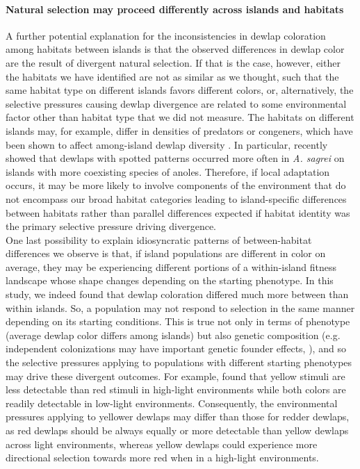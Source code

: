\paragraph{Natural selection may proceed differently across islands and habitats} A further potential explanation for the inconsistencies in dewlap coloration among habitats between islands is that the observed differences in dewlap color are the result of divergent natural selection. If that is the case, however, either the habitats we have identified are not as similar as we thought, such that the same habitat type on different islands favors different colors, or, alternatively, the selective pressures causing dewlap divergence are related to some environmental factor other than habitat type that we did not measure. The habitats on different islands may, for example, differ in densities of predators or congeners, which have been shown to affect among-island dewlap diversity \cite{Vanhooydonck2009, Baeckens2018}. In particular, \citet{Baeckens2018} recently showed that dewlaps with spotted patterns occurred more often in \textit{A. sagrei} on islands with more coexisting species of anoles. Therefore, if local adaptation occurs, it may be more likely to involve components of the environment that do not encompass our broad habitat categories leading to island-specific differences between habitats rather than parallel differences expected if habitat identity was the primary selective pressure driving divergence.\\ 

One last possibility to explain idiosyncratic patterns of between-habitat differences we observe is that, if island populations are different in color on average, they may be experiencing different portions of a within-island fitness landscape whose shape changes depending on the starting phenotype. In this study, we indeed found that dewlap coloration differed much more between than within islands. So, a population may not respond to selection in the same manner depending on its starting conditions. This is true not only in terms of phenotype (average dewlap color differs among islands) but also genetic composition (e.g. independent colonizations may have important genetic founder effects, \citealt{Reynolds2020}), and so the selective pressures applying to populations with different starting phenotypes may drive these divergent outcomes. For example, \citet{Fleishman2020} found that yellow stimuli are less detectable than red stimuli in high-light environments while both colors are readily detectable in low-light environments. Consequently, the environmental pressures applying to yellower dewlaps may differ than those for redder dewlaps, as red dewlaps should be always equally or more detectable than yellow dewlaps across light environments, whereas yellow dewlaps could experience more directional selection towards more red when in a high-light environments.

